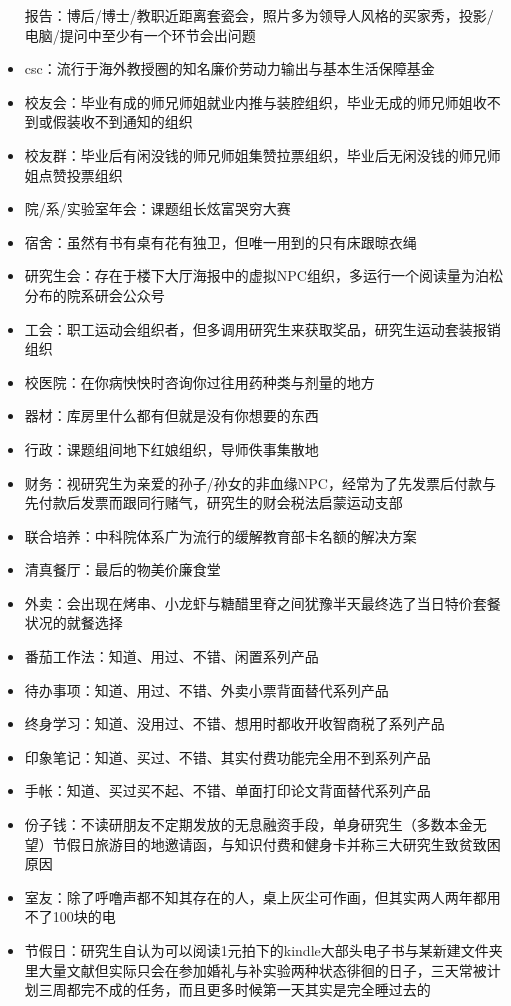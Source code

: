 \documentclass[]{tufte-book}
\begin{document}
\begin{itemize}
  报告：博后/博士/教职近距离套瓷会，照片多为领导人风格的买家秀，投影/电脑/提问中至少有一个环节会出问题
\item
  csc：流行于海外教授圈的知名廉价劳动力输出与基本生活保障基金
\item
  校友会：毕业有成的师兄师姐就业内推与装腔组织，毕业无成的师兄师姐收不到或假装收不到通知的组织
\item
  校友群：毕业后有闲没钱的师兄师姐集赞拉票组织，毕业后无闲没钱的师兄师姐点赞投票组织
\item
  院/系/实验室年会：课题组长炫富哭穷大赛
\item
  宿舍：虽然有书有桌有花有独卫，但唯一用到的只有床跟晾衣绳
\item
  研究生会：存在于楼下大厅海报中的虚拟NPC组织，多运行一个阅读量为泊松分布的院系研会公众号
\item
  工会：职工运动会组织者，但多调用研究生来获取奖品，研究生运动套装报销组织
\item
  校医院：在你病怏怏时咨询你过往用药种类与剂量的地方
\item
  器材：库房里什么都有但就是没有你想要的东西
\item
  行政：课题组间地下红娘组织，导师佚事集散地
\item
  财务：视研究生为亲爱的孙子/孙女的非血缘NPC，经常为了先发票后付款与先付款后发票而跟同行赌气，研究生的财会税法启蒙运动支部
\item
  联合培养：中科院体系广为流行的缓解教育部卡名额的解决方案
\item
  清真餐厅：最后的物美价廉食堂
\item
  外卖：会出现在烤串、小龙虾与糖醋里脊之间犹豫半天最终选了当日特价套餐状况的就餐选择
\item
  番茄工作法：知道、用过、不错、闲置系列产品
\item
  待办事项：知道、用过、不错、外卖小票背面替代系列产品
\item
  终身学习：知道、没用过、不错、想用时都收开收智商税了系列产品
\item
  印象笔记：知道、买过、不错、其实付费功能完全用不到系列产品
\item
  手帐：知道、买过买不起、不错、单面打印论文背面替代系列产品
\item
  份子钱：不读研朋友不定期发放的无息融资手段，单身研究生（多数本金无望）节假日旅游目的地邀请函，与知识付费和健身卡并称三大研究生致贫致困原因
\item
  室友：除了呼噜声都不知其存在的人，桌上灰尘可作画，但其实两人两年都用不了100块的电
\item
  节假日：研究生自认为可以阅读1元拍下的kindle大部头电子书与某新建文件夹里大量文献但实际只会在参加婚礼与补实验两种状态徘徊的日子，三天常被计划三周都完不成的任务，而且更多时候第一天其实是完全睡过去的

\end{itemize}
\end{document}
